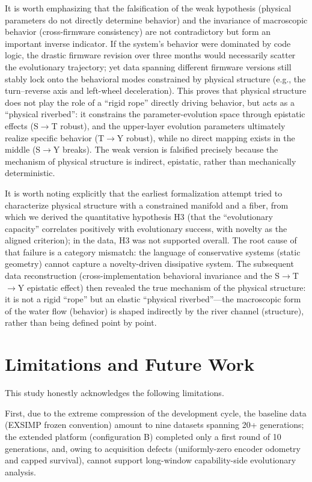 \documentclass[11pt]{article}
\begin{document}
It is worth emphasizing that the falsification of the weak hypothesis (physical parameters do not directly determine behavior) and the invariance of macroscopic behavior (cross-firmware consistency) are not contradictory but form an important inverse indicator. If the system's behavior were dominated by code logic, the drastic firmware revision over three months would necessarily scatter the evolutionary trajectory; yet data spanning different firmware versions still stably lock onto the behavioral modes constrained by physical structure (e.g., the turn--reverse axis and left-wheel deceleration). This proves that physical structure does not play the role of a ``rigid rope'' directly driving behavior, but acts as a ``physical riverbed'': it constrains the parameter-evolution space through epistatic effects (S$\rightarrow$T robust), and the upper-layer evolution parameters ultimately realize specific behavior (T$\rightarrow$Y robust), while no direct mapping exists in the middle (S$\rightarrow$Y breaks). The weak version is falsified precisely because the mechanism of physical structure is indirect, epistatic, rather than mechanically deterministic.

It is worth noting explicitly that the earliest formalization attempt tried to characterize physical structure with a constrained manifold and a fiber, from which we derived the quantitative hypothesis H3 (that the ``evolutionary capacity'' correlates positively with evolutionary success, with novelty as the aligned criterion); in the data, H3 was not supported overall. The root cause of that failure is a category mismatch: the language of conservative systems (static geometry) cannot capture a novelty-driven dissipative system. The subsequent data reconstruction (cross-implementation behavioral invariance and the S$\rightarrow$T$\rightarrow$Y epistatic effect) then revealed the true mechanism of the physical structure: it is not a rigid ``rope'' but an elastic ``physical riverbed''---the macroscopic form of the water flow (behavior) is shaped indirectly by the river channel (structure), rather than being defined point by point.

\section{Limitations and Future Work}
This study honestly acknowledges the following limitations.

First, due to the extreme compression of the development cycle, the baseline data (EXSIMP frozen convention) amount to nine datasets spanning 20+ generations; the extended platform (configuration B) completed only a first round of 10 generations, and, owing to acquisition defects (uniformly-zero encoder odometry and capped survival), cannot support long-window capability-side evolutionary analysis.
\end{document}
